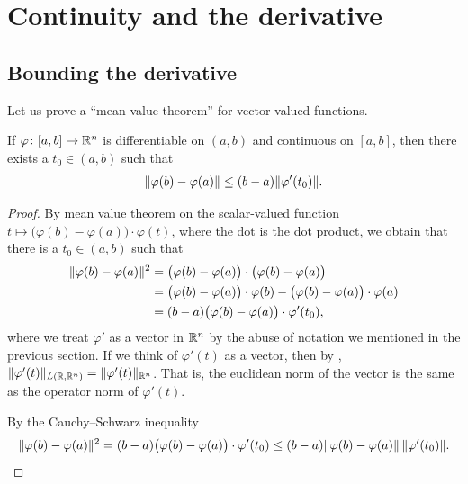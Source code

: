 
\sectionnewpage
\section{Continuity and the derivative}
\label{sec:svthedercont}


\subsection{Bounding the derivative}

Let us prove a ``mean value theorem'' for vector-valued functions.

\begin{lemma}
If $\varphi \colon [a,b] \to {\mathbb{R}}^n$ is differentiable on $(a,b)$ and
continuous on $[a,b]$, then there exists a $t_0 \in (a,b)$ such that
\begin{equation*}
\lVert {\varphi(b)-\varphi(a)} \rVert \leq (b-a) \lVert {\varphi'(t_0)} \rVert .
\end{equation*}
\end{lemma}

\begin{proof}
By mean value theorem on the scalar-valued function
$t \mapsto \bigl(\varphi(b)-\varphi(a) \bigr) \cdot \varphi(t)$,
where the dot is the dot product, we obtain
that
there is a $t_0 \in (a,b)$ such that
\begin{equation*}
\begin{split}
\lVert {\varphi(b)-\varphi(a)} \rVert^2
& =
\bigl( \varphi(b)-\varphi(a) \bigr)
\cdot
\bigl( \varphi(b)-\varphi(a) \bigr)
\\
& =
\bigl(\varphi(b)-\varphi(a) \bigr) \cdot \varphi(b) - 
\bigl(\varphi(b)-\varphi(a) \bigr) \cdot \varphi(a)
\\
& = 
(b-a)
\bigl(\varphi(b)-\varphi(a) \bigr) \cdot \varphi'(t_0) ,
\end{split}
\end{equation*}
where we treat $\varphi'$ as a vector in ${\mathbb{R}}^n$ by the abuse of
notation we mentioned in the previous section.
If we think of $\varphi'(t)$ as a vector, then by
,
$\lVert {\varphi'(t)} \rVert_{L({\mathbb{R}},{\mathbb{R}}^n)} = \lVert {\varphi'(t)} \rVert_{{\mathbb{R}}^n}$.
That is, the euclidean norm of the vector is the same as the operator norm
of $\varphi'(t)$.

By the Cauchy--Schwarz inequality
\begin{equation*}
\lVert {\varphi(b)-\varphi(a)} \rVert^2
=
(b-a)\bigl(\varphi(b)-\varphi(a) \bigr) \cdot \varphi'(t_0)
\leq
(b-a)
\lVert {\varphi(b)-\varphi(a)} \rVert \, \lVert {\varphi'(t_0)} \rVert . \qedhere
\end{equation*}
\end{proof}

